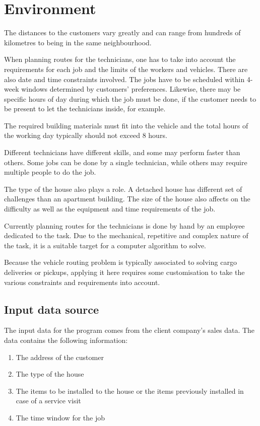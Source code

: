 \chapter{Environment}
\label{chapter:environment}



The distances to the customers vary greatly and can range from hundreds of kilometres to being in the same neighbourhood. 

When planning routes for the technicians, one has to take into account the requirements for each job and the limits of the workers and vehicles. There are also date and time constraints involved. The jobs have to be scheduled within 4-week windows determined by customers' preferences. Likewise, there may be specific hours of day during which the job must be done, if the customer needs to be present to let the technicians inside, for example. 

The required building materials must fit into the vehicle and the total hours of the working day typically should not exceed 8 hours. 

Different technicians have different skills, and some may perform faster than others. Some jobs can be done by a single technician, while others may require multiple people to do the job. 

The type of the house also plays a role. A detached house has different set of challenges than an apartment building. The size of the house also affects on the difficulty as well as the equipment and time requirements of the job.

Currently planning routes for the technicians is done by hand by an employee dedicated to the task. Due to the mechanical, repetitive and complex nature of the task, it is a suitable target for a computer algorithm to solve.

Because the vehicle routing problem is typically associated to solving cargo deliveries or pickups, applying it here requires some customisation to take the various constraints and requirements into account. 

\section{Input data source}

The input data for the program comes from the client company's sales data. The data contains the following information:

\begin{enumerate}  
\item The address of the customer
\item The type of the house 
\item The items to be installed to the house or the items previously installed in case of a service visit
\item The time window for the job
\end{enumerate}

